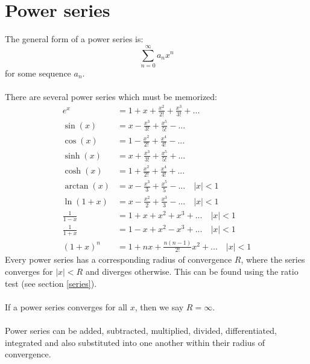 \documentclass{scrartcl}
\begin{document}
\section{Power series}
The general form of a power series is:
\begin{equation}
\sum_{n=0}^{\infty} a_{n} x^{n}
\end{equation}
for some sequence $ a_{n} $.
\\\\ 
There are several power series which must be memorized:
\begin{align}
e^{x} & = 1 + x + \frac{x^{2}}{2!} + \frac{x^{3}}{3!} + ... \\
\sin(x) & = x - \frac{x^{3}}{3!} + \frac{x^{5}}{5!} - ... \\
\cos(x) & = 1 - \frac{x^{2}}{2!} + \frac{x^{4}}{4!} - ... \\
\sinh(x) & = x + \frac{x^{3}}{3!} + \frac{x^{5}}{5!} + ... \\
\cosh(x) & = 1 + \frac{x^{2}}{2!} + \frac{x^{4}}{4!} + ... \\
\arctan(x) & = x - \frac{x^{3}}{3} + \frac{x^{5}}{5} - ... \quad |x| < 1 \\
\ln{(1+x)} & = x - \frac{x^{2}}{2} + \frac{x^{3}}{3} - ... \quad |x| < 1 \\
\frac{1}{1-x} & = 1 + x + x^{2} + x^{3} + ... \quad |x| < 1 \\
\frac{1}{1+x} & = 1 - x + x^{2} - x^{3} + ... \quad |x| < 1 \\
(1+x)^{n} & = 1 + nx + \frac{n(n-1)}{2!}x^{2} + ... \quad |x| < 1
\end{align}
Every power series has a corresponding radius of convergence $ R $, where the series converges for $ |x| < R $ and diverges otherwise. This can be found using the ratio test (see section \ref{series}).
\\\\
If a power series converges for all $ x $, then we say $ R = \infty $.
\\\\
Power series can be added, subtracted, multiplied, divided, differentiated, integrated and also substituted into one another within their radius of convergence.
\end{document}
